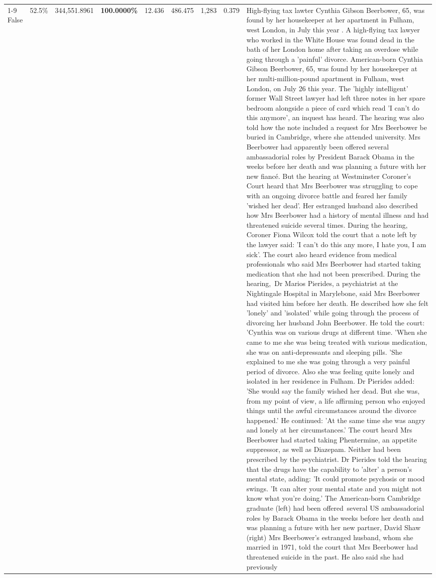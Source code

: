 \begin{table}[H]
\begin{tabular}{lllrlllll}
\cline{1-9}
False & 52.5\% & 344,551.8961 & \bfseries \color{red} 100.0000\% & 12.436 & 486.475 & 1,283 & 0.379 & High-flying tax lawter Cynthia Gibson Beerbower, 65, was found by her housekeeper at her apartment in Fulham, west London, in July this year . A high-flying tax lawyer who worked in the White House was found dead in the bath of her London home after taking an overdose while going through a 'painful' divorce. American-born Cynthia Gibson Beerbower, 65, was found by her housekeeper at her multi-million-pound apartment in Fulham, west London, on July 26 this year. The 'highly intelligent' former Wall Street lawyer had left three notes in her spare bedroom alongside a piece of card which read 'I can't do this anymore', an inquest has heard. The hearing was also told how the note included a request for Mrs Beerbower be buried in Cambridge, where she attended university. Mrs Beerbower had apparently been offered several ambassadorial roles by President Barack Obama in the weeks before her death and was planning a future with her new fiancé. But the hearing at Westminster Coroner's Court heard that Mrs Beerbower was struggling to cope with an ongoing divorce battle and feared her family 'wished her dead'. Her estranged husband also described how Mrs Beerbower had a history of mental illness and had threatened suicide several times. During the hearing, Coroner Fiona Wilcox told the court that a note left by the lawyer said: 'I can't do this any more, I hate you, I am sick'. The court also heard evidence from medical professionals who said Mrs Beerbower had started taking medication that she had not been prescribed. During the hearing, Dr Marios Pierides, a psychiatrist at the Nightingale Hospital in Marylebone, said Mrs Beerbower had visited him before her death. He described how she felt 'lonely' and 'isolated' while going through the process of divorcing her husband John Beerbower. He told the court: 'Cynthia was on various drugs at different time. 'When she came to me she was being treated with various medication, she was on anti-depressants and sleeping pills. 'She explained to me she was going through a very painful period of divorce. Also she was feeling quite lonely and isolated in her residence in Fulham. Dr Pierides added: 'She would say the family wished her dead. But she was, from my point of view, a life affirming person who enjoyed things until the awful circumstances around the divorce happened.' He continued: 'At the same time she was angry and lonely at her circumstances.' The court heard Mrs Beerbower had started taking Phentermine, an appetite suppressor, as well as Diazepam. Neither had been prescribed by the psychiatrist. Dr Pierides told the hearing that the drugs have the capability to 'alter' a person's mental state, adding: 'It could promote psychosis or mood swings. 'It can alter your mental state and you might not know what you're doing.' The American-born Cambridge graduate (left) had been offered several US ambassadorial roles by Barack Obama in the weeks before her death and was planning a future with her new partner, David Shaw (right) Mrs Beerbower's estranged husband, whom she married in 1971, told the court that Mrs Beerbower had threatened suicide in the past. He also said she had previously 
\end{tabular}
\end{table}
